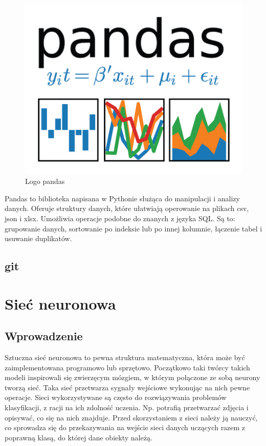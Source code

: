 \documentclass{report}
\begin{document}
    \begin{figure}[h!]
        \centering
        \includegraphics[scale=0.4]{./img/pandas-logo.png}
        \caption{Logo pandas}
    \end{figure}

    Pandas to biblioteka napisana w Pythonie służąca do manipulacji i analizy danych.
    Oferuje struktury danych, które ułatwiają operowanie na plikach csv, json i xlsx.
    Umożliwia operacje podobne do znanych z języka SQL.
    Są to: grupowanie danych, sortowanie po indeksie lub po innej kolumnie, łączenie tabel i usuwanie duplikatów.

    \section{git}

    \chapter{Sieć neuronowa}

    \section{Wprowadzenie}

    Sztuczna sieć neuronowa to pewna struktura matematyczna, która może być zaimplementowana programowo lub sprzętowo.
    Początkowo taki twórcy takich modeli inspirowali się zwierzęcym mózgiem, w którym połączone ze sobą neurony tworzą sieć.
    Taka sieć przetwarza sygnały wejściowe wykonując na nich pewne operacje.
    Sieci wykorzystywane są często do rozwiązywania problemów klasyfikacji, z racji na ich zdolność uczenia.
    Np. potrafią przetwarzać zdjęcia i opisywać, co się na nich znajduje.
    Przed skorzystaniem z sieci należy ją nauczyć, co sprowadza się do przekazywania na wejście sieci danych uczących razem z poprawną klasą, do której dane obiekty należą.
\end{document}
